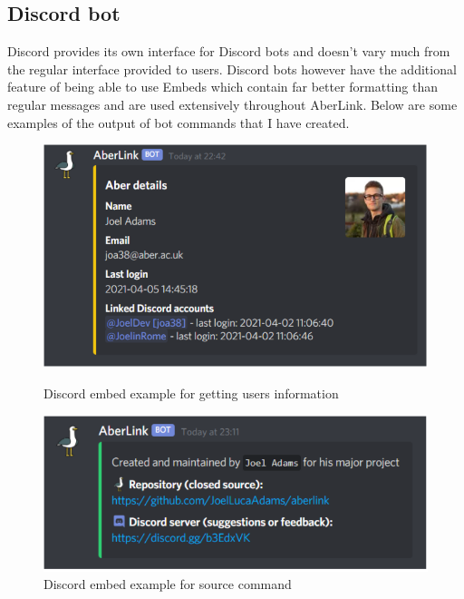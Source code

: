 \subsection{Discord bot}
Discord provides its own interface for Discord bots and doesn't vary much from the regular interface provided to users. Discord bots however have the additional feature of being able to use Embeds which contain far better formatting than regular messages and are used extensively throughout AberLink. Below are some examples of the output of bot commands that I have created.
\begin{figure}[H]
	\centering
	\begin{minipage}{0.45\textwidth}
		\centering
		\includegraphics[width=1.2\textwidth]{Figures/test-2}
		\caption{Discord embed example for getting users information}
		\label{fig:dis-go}
	\end{minipage}\hfill
	\begin{minipage}{0.45\textwidth}
		\centering
		\includegraphics[width=1.2\textwidth]{Figures/test}
		\caption{Discord embed example for source command}
		\label{fig:dis-source}
	\end{minipage}
\end{figure}

